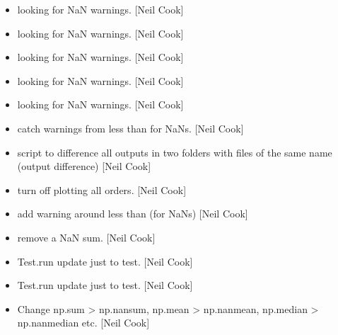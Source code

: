 \documentclass[a4paper,10pt,english]{report}
\begin{document}
\begin{itemize}
\item {} 
 \sphinxhyphen{} looking for NaN warnings. {[}Neil Cook{]}

\item {} 
 \sphinxhyphen{} looking for NaN warnings. {[}Neil Cook{]}

\item {} 
 \sphinxhyphen{} looking for NaN warnings. {[}Neil Cook{]}

\item {} 
 \sphinxhyphen{} looking for NaN warnings. {[}Neil Cook{]}

\item {} 
 \sphinxhyphen{} looking for NaN warnings. {[}Neil Cook{]}

\item {} 
 \sphinxhyphen{} catch warnings from less than for NaNs. {[}Neil
Cook{]}

\item {} 
 \sphinxhyphen{} script to difference all outputs in two folders
with files of the same name (output difference) {[}Neil Cook{]}

\item {} 
 \sphinxhyphen{} turn off plotting all  orders.
{[}Neil Cook{]}

\item {} 
 \sphinxhyphen{} add warning around less than (for NaNs) {[}Neil
Cook{]}

\item {} 
 \sphinxhyphen{} remove a NaN sum. {[}Neil Cook{]}

\item {} 
Test.run \sphinxhyphen{} update just  to test. {[}Neil Cook{]}

\item {} 
Test.run \sphinxhyphen{} update just  to test. {[}Neil Cook{]}

\item {} 
Change np.sum \textendash{}\textgreater{} np.nansum, np.mean \textendash{}\textgreater{} np.nanmean, np.median \textendash{}\textgreater{}
np.nanmedian etc. {[}Neil Cook{]}

\end{itemize}
\end{document}
